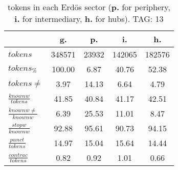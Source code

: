 \begin{table}[h!]
\begin{center}
\begin{tabular}{| l | c | c | c | c |}\hline
 & g. & p. & i. & h. \\\hline
$tokens$ & 348571  & 23932  & 142065  & 182576 \\\hline
$tokens_{\%}$ & 100.00  & 6.87  & 40.76  & 52.38 \\\hline
$tokens \neq$ & 3.97  & 14.13  & 6.64  & 4.79 \\\hline
$\frac{knownw}{tokens}$ & 41.85  & 40.84  & 41.17  & 42.51 \\\hline
$\frac{knownw \neq}{knownw}$ & 6.39  & 25.53  & 11.01  & 8.47 \\\hline
$\frac{stopw}{knownw}$ & 92.88  & 95.61  & 90.73  & 94.15 \\\hline
$\frac{punct}{tokens}$ & 14.97  & 15.04  & 15.64  & 14.44 \\\hline
$\frac{contrac}{tokens}$ & 0.82  & 0.92  & 1.01  & 0.66 \\\hline
\end{tabular}
\caption{tokens in each Erd\"os sector ({{\bf p.}} for periphery, {{\bf i.}} for intermediary, 
    {{\bf h.}} for hubs). TAG: 13}
\end{center}
\end{table}